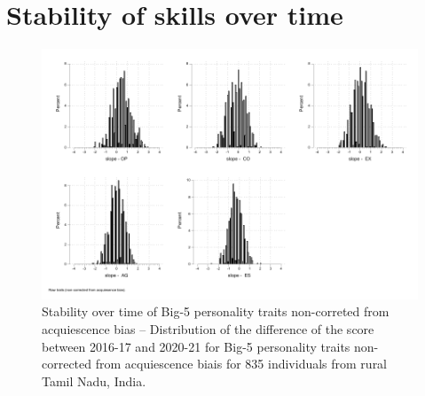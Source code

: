 \documentclass[a4paper, 11pt, onecolumn]{article}
\begin{document}



\section{Stability of skills over time}
\label{section:stab_big5}



\begin{figure}[!htb]
\raggedright
\includegraphics[scale=0.86]{INPUT/diffcont_raw}
\caption{Stability over time of Big-5 personality traits non-correted from acquiescence bias -- Distribution of the difference of the score between 2016-17 and 2020-21 for Big-5 personality traits non-corrected from acquiescence biais for 835 individuals from rural Tamil Nadu, India.}
\label{fig:stabraw}
\end{figure}
\end{document}
